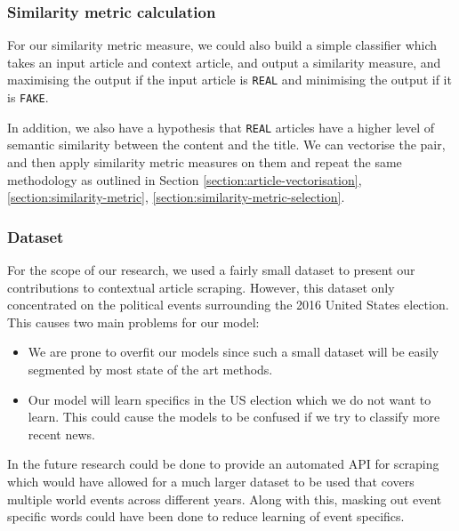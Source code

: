 \documentclass{article}
\begin{document}
\subsubsection*{Similarity metric calculation}\label{limitation:similarity-metric}
For our similarity metric measure, we could also build a simple classifier which takes an input article and context article, and output a similarity measure, and maximising the output if the input article is \texttt{REAL} and minimising the output if it is \texttt{FAKE}.

In addition, we also have a hypothesis that \texttt{REAL} articles have a higher level of semantic similarity between the content and the title. We can vectorise the pair, and then apply similarity metric measures on them and repeat the same methodology as outlined in Section \ref{section:article-vectorisation}, \ref{section:similarity-metric}, \ref{section:similarity-metric-selection}.

\subsubsection*{Dataset}

For the scope of our research, we used a fairly small dataset to present our contributions to contextual article scraping. However, this dataset only concentrated on the political events surrounding the 2016 United States election. This causes two main problems for our model:
\begin{itemize}
  \item We are prone to overfit our models since such a small dataset will be easily segmented by most state of the art methods.
  \item Our model will learn specifics in the US election which we do not want to learn. This could cause the models to be confused if we try to classify more recent news.
\end{itemize}

In the future research could be done to provide an automated API for scraping which would have allowed for a much larger dataset to be used that covers multiple world events across different years. Along with this, masking out event specific words could have been done to reduce learning of event specifics.

\cleardoublepage
\pagebreak

\nocite{*}
\printbibliography

\cleardoublepage
\pagebreak
\end{document}
